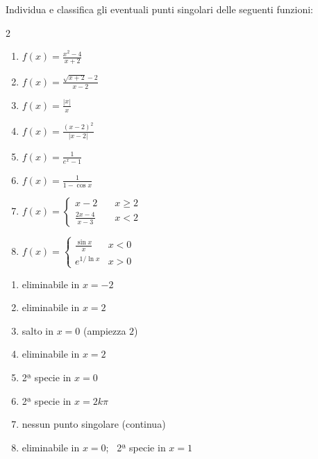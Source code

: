 
\begin{question}[ID=2.1, subtitle={Punti singolari — serie 1}, tags={continuità, punti singolari}, difficulty=media]
Individua e classifica gli eventuali punti singolari delle seguenti funzioni:
\begin{center}\begin{minipage}{0.92\linewidth}
\begin{multicols}{2}
\begin{enumerate}[label=\arabic*),leftmargin=3.2cm]
\item $f(x) = \frac{x^2-4}{x+2}$
\item $f(x) = \frac{\sqrt{x+2}-2}{x-2}$
\item $f(x) = \frac{|x|}{x}$
\item $f(x) = \frac{(x-2)^2}{|x-2|}$
\item $f(x) = \frac{1}{e^x-1}$
\item $f(x) = \frac{1}{1-\cos x}$
\item $f(x) = \begin{cases} x - 2 \quad & x \ge 2 \\ \frac{2x-4}{x-3} \quad & x < 2 \end{cases}$
\item $f(x) = \begin{cases} \frac{\sin x}{x} & x < 0 \\ e^{1/\ln x} & x > 0 \end{cases}$
\end{enumerate}
\end{multicols}
\end{minipage}\end{center}
\begin{solution}
\begin{enumerate}[label=\arabic*)]
    \item eliminabile in $x=-2$
    \item eliminabile in $x=2$
    \item salto in $x=0$ (ampiezza $2$)
    \item eliminabile in $x=2$
    \item 2ª specie in $x=0$
    \item 2ª specie in $x=2k\pi$
    \item nessun punto singolare (continua)
    \item eliminabile in $x=0$; \ 2ª specie in $x=1$
\end{enumerate}
\end{solution}

\end{question}
